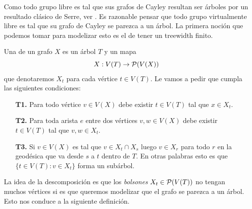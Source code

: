 \documentclass[tesis.tex]{subfiles}
\begin{document}
Como todo grupo libre es tal que sus grafos de Cayley resultan ser árboles por un resultado clásico de Serre, ver \cite{}.
Es razonable pensar que todo grupo virtualmente libre es tal que su grafo de Cayley se parezca a un árbol. 
La primera noción que podemos tomar para modelizar esto es el de tener un treewidth finito.

\begin{deff}\label{desc-arbol}
	 Una  de un grafo $X$ es un árbol $T$ y un mapa 
	 \[
	 X: V(T) \to {\cal P}(V(X))
	 \]
	  que denotaremos $X_t$ para cada vértice $t \in V(T)$. 
	  Le vamos a pedir que cumpla las siguientes condiciones:
	\begin{enumerate}
		\item[\textbf{T1.}] Para todo vértice $v \in V(X)$ debe existir $t \in V(T)$ tal que $x \in X_t$. 
		\item[\textbf{T2.}] Para toda arista $e$ entre dos vértices $v,w \in V(X)$ debe existir $t \in V(T)$ tal que $v,w \in X_t$.
		\item[\textbf{T3.}] Si $v \in V(X)$ es tal que $v \in X_t \cap X_s$ luego $v \in X_r$ para todo $r$ en la geodésica que va desde $s$ a $t$ dentro de $T$. En otras palabras esto es que $\{ t \in V(T) :  v \in X_t \}$ forma un subárbol. 
	\end{enumerate} 
\end{deff}
\smallskip

La idea de la descomposición es que los \emph{bolsones} $X_t \in {\cal P}(V(T))$ no tengan muchos vértices si es que queremos modelizar que el grafo se parezca a un árbol. Esto nos conduce a la siguiente definición.
\end{document}
